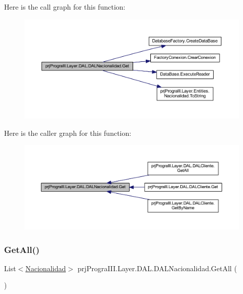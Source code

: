 Here is the call graph for this function\+:
\nopagebreak
\begin{figure}[H]
\begin{center}
\leavevmode
\includegraphics[width=350pt]{classprj_progra_i_i_i_1_1_layer_1_1_d_a_l_1_1_d_a_l_nacionalidad_aaae73fec1bc1e05c37358116139ce47a_cgraph}
\end{center}
\end{figure}
Here is the caller graph for this function\+:
\nopagebreak
\begin{figure}[H]
\begin{center}
\leavevmode
\includegraphics[width=350pt]{classprj_progra_i_i_i_1_1_layer_1_1_d_a_l_1_1_d_a_l_nacionalidad_aaae73fec1bc1e05c37358116139ce47a_icgraph}
\end{center}
\end{figure}
\hypertarget{classprj_progra_i_i_i_1_1_layer_1_1_d_a_l_1_1_d_a_l_nacionalidad_a7a851ef044363eb2a9be47aaa154b40b}{}\label{classprj_progra_i_i_i_1_1_layer_1_1_d_a_l_1_1_d_a_l_nacionalidad_a7a851ef044363eb2a9be47aaa154b40b} 
\subsubsection{\texorpdfstring{Get\+All()}{GetAll()}}
{\footnotesize\ttfamily List$<$\hyperlink{classprj_progra_i_i_i_1_1_layer_1_1_entities_1_1_nacionalidad}{Nacionalidad}$>$ prj\+Progra\+I\+I\+I.\+Layer.\+D\+A\+L.\+D\+A\+L\+Nacionalidad.\+Get\+All (\begin{DoxyParamCaption}{ }\end{DoxyParamCaption})}



